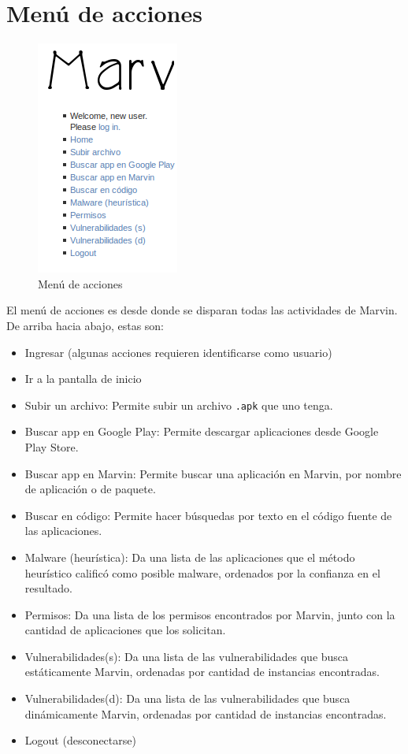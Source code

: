 \documentclass[11pt]{article}
\begin{document}
\section{Menú de acciones}
\begin{figure}[H]
\begin{center}
\includegraphics[width=.4\textwidth]{graphics/marvin_panel.png}
\caption{Menú de acciones}
\end{center}
\end{figure}
El menú de acciones es desde donde se disparan todas las actividades de Marvin. De arriba hacia abajo, estas son: 
\begin{itemize}
\item Ingresar (algunas acciones requieren identificarse como usuario)
\item Ir a la pantalla de inicio
\item Subir un archivo: Permite subir un archivo \texttt{.apk} que uno tenga.
\item Buscar app en Google Play: Permite descargar aplicaciones desde Google Play Store.
\item Buscar app en Marvin: Permite buscar una aplicación en Marvin, por nombre de aplicación o de paquete.
\item Buscar en código: Permite hacer búsquedas por texto en el código fuente de las aplicaciones.
\item Malware (heurística): Da una lista de las aplicaciones que el método heurístico calificó como posible malware, ordenados por la confianza en el resultado.
\item Permisos: Da una lista de los permisos encontrados por Marvin, junto con la cantidad de aplicaciones que los solicitan.
\item Vulnerabilidades(s): Da una lista de las vulnerabilidades que busca estáticamente Marvin, ordenadas por cantidad de instancias encontradas.
\item Vulnerabilidades(d): Da una lista de las vulnerabilidades que busca dinámicamente Marvin, ordenadas por cantidad de instancias encontradas.
\item Logout (desconectarse)
\end{itemize}
\end{document}
